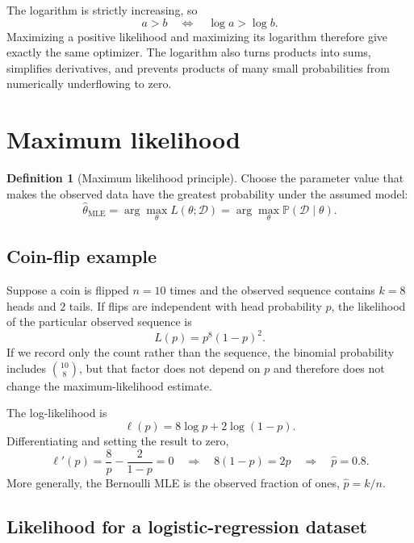 \documentclass[11pt]{article}
\newcommand{\Prob}{\mathbb{P}}
\theoremstyle{definition}
\newtheorem{definition}{Definition}[section]
\begin{document}
The logarithm is strictly increasing, so
\[
a>b\quad\Longleftrightarrow\quad \log a>\log b.
\]
Maximizing a positive likelihood and maximizing its logarithm therefore give exactly the same optimizer. The logarithm also turns products into sums, simplifies derivatives, and prevents products of many small probabilities from numerically underflowing to zero.

\section{Maximum likelihood}

\begin{definition}[Maximum likelihood principle]
Choose the parameter value that makes the observed data have the greatest probability under the assumed model:
\[
\widehat\theta_{\mathrm{MLE}}
=\arg\max_\theta L(\theta;\mathcal D)
=\arg\max_\theta \Prob(\mathcal D\mid\theta).
\]
\end{definition}

\subsection{Coin-flip example}

Suppose a coin is flipped $n=10$ times and the observed sequence contains $k=8$ heads and $2$ tails. If flips are independent with head probability $p$, the likelihood of the particular observed sequence is
\[
L(p)=p^8(1-p)^2.
\]
If we record only the count rather than the sequence, the binomial probability includes $\binom{10}{8}$, but that factor does not depend on $p$ and therefore does not change the maximum-likelihood estimate.

The log-likelihood is
\[
\ell(p)=8\log p+2\log(1-p).
\]
Differentiating and setting the result to zero,
\[
\ell'(p)=\frac{8}{p}-\frac{2}{1-p}=0
\quad\Longrightarrow\quad
8(1-p)=2p
\quad\Longrightarrow\quad
\widehat p=0.8.
\]
More generally, the Bernoulli MLE is the observed fraction of ones, $\widehat p=k/n$.

\subsection{Likelihood for a logistic-regression dataset}
\end{document}
